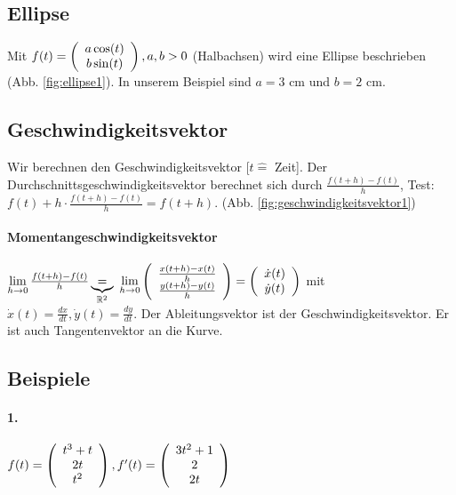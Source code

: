 \renewcommand{\ldate}{2015-10-16}

\subsection{Ellipse}
Mit $ f(t)=   \left(  \begin{array}{c}  a \cos(t)\\ b \sin(t)  \end{array}  \right)  , a,b > 0 $ (Halbachsen) wird eine Ellipse beschrieben (Abb. \ref{fig:ellipse1}). In unserem Beispiel sind $a=3$ cm und $b=2$ cm. 

\subsection{Geschwindigkeitsvektor}
Wir berechnen den Geschwindigkeitsvektor [$t\widehat{=}$ Zeit]. Der Durchschnittsgeschwindigkeitsvektor berechnet sich durch $ \frac{f(t+h)-f(t)}{h}$, Test: $ f(t)+h\cdot \frac{f(t+h)-f(t)}{h} = f(t+h)$. (Abb. \ref{fig:geschwindigkeitsvektor1})

\paragraph{Momentangeschwindigkeitsvektor} 
$\lim\limits_{h\rightarrow 0} \frac{f(t+h)-f(t)}{h} \underbrace{=}_{\mathbb{R}^2} $ 
$\lim\limits_{h\rightarrow 0}   \left(  \begin{array}{c}  \frac{x(t+h)-x(t)}{h}\\ \frac{y(t+h)-y(t)}{h}  \end{array}  \right)   =   \left(  \begin{array}{c}  \dot{x}(t) \\ \dot{y}(t)  \end{array}  \right)   $ mit
$ \dot{x}(t) = \frac{dx}{dt}, \dot{y}(t) = \frac{dy}{dt} $. Der Ableitungsvektor ist der Geschwindigkeitsvektor. Er ist auch Tangentenvektor an die Kurve. 

\subsection{Beispiele}
\paragraph{1.} $ f(t) =   \left(  \begin{array}{c}  t^3 + t\\ 2t\\t^2 \end{array}  \right)  , f'(t)=   \left(  \begin{array}{c}  3t^2 + 1\\2\\2t \end{array}  \right)  $
